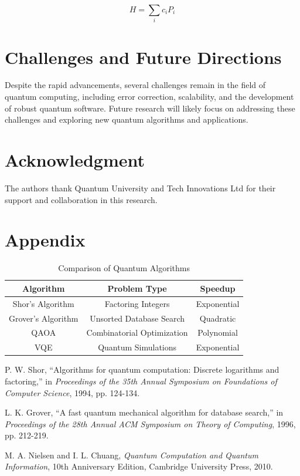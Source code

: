 \documentclass[conference]{IEEEtran}
\begin{document}
\begin{equation}
    H = \sum_{i} c_i P_i
\end{equation}

\section{Challenges and Future Directions}
Despite the rapid advancements, several challenges remain in the field of quantum computing, including error correction, scalability, and the development of robust quantum software. Future research will likely focus on addressing these challenges and exploring new quantum algorithms and applications.

\section*{Acknowledgment}
The authors thank Quantum University and Tech Innovations Ltd for their support and collaboration in this research.

\section{Appendix}

\begin{table}[h]
\caption{Comparison of Quantum Algorithms}
\label{tab:algorithms}
\centering
\begin{tabular}{|c|c|c|}
\hline
\textbf{Algorithm} & \textbf{Problem Type} & \textbf{Speedup} \\
\hline
Shor's Algorithm & Factoring Integers & Exponential \\
\hline
Grover's Algorithm & Unsorted Database Search & Quadratic \\
\hline
QAOA & Combinatorial Optimization & Polynomial \\
\hline
VQE & Quantum Simulations & Exponential \\
\hline
\end{tabular}
\end{table}

\begin{thebibliography}{1}

P. W. Shor, ``Algorithms for quantum computation: Discrete logarithms and factoring,'' in \emph{Proceedings of the 35th Annual Symposium on Foundations of Computer Science}, 1994, pp. 124-134.

L. K. Grover, ``A fast quantum mechanical algorithm for database search,'' in \emph{Proceedings of the 28th Annual ACM Symposium on Theory of Computing}, 1996, pp. 212-219.

M. A. Nielsen and I. L. Chuang, \emph{Quantum Computation and Quantum Information}, 10th Anniversary Edition, Cambridge University Press, 2010.

\end{thebibliography}
\end{document}
